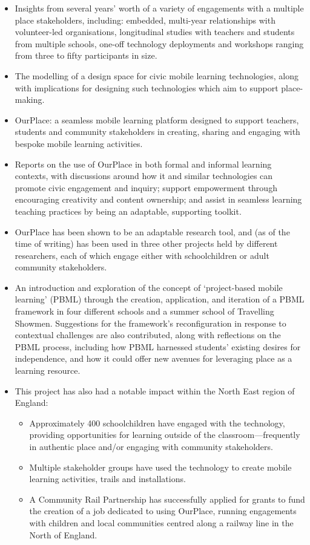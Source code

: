 \begin{itemize}
    \item Insights from several years' worth of a variety of engagements with a multiple place stakeholders, including: embedded, multi-year relationships with volunteer-led organisations, longitudinal studies with teachers and students from multiple schools, one-off technology deployments and workshops ranging from three to fifty participants in size.
    \item The modelling of a design space for civic mobile learning technologies, along with implications for designing such technologies which aim to support place-making.
    \item OurPlace: a seamless mobile learning platform designed to support teachers, students and community stakeholders in creating, sharing and engaging with bespoke mobile learning activities.
    \item Reports on the use of OurPlace in both formal and informal learning contexts, with discussions around how it and similar technologies can promote civic engagement and inquiry; support empowerment through encouraging creativity and content ownership; and assist in seamless learning teaching practices by being an adaptable, supporting toolkit.
    \item OurPlace has been shown to be an adaptable research tool, and (as of the time of writing) has been used in three other projects held by different researchers, each of which engage either with schoolchildren or adult community stakeholders.
    \item An introduction and exploration of the concept of `project-based mobile learning' (PBML) through the creation, application, and iteration of a PBML framework in four different schools and a summer school of Travelling Showmen. Suggestions for the framework's reconfiguration in response to contextual challenges are also contributed, along with reflections on the PBML process, including how PBML harnessed students’ existing desires for independence, and how it could offer new avenues for leveraging place as a learning resource.
    \item This project has also had a notable impact within the North East region of England:
    \begin{itemize}
    \item Approximately 400 schoolchildren have engaged with the technology, providing opportunities for learning outside of the classroom---frequently in authentic place and/or engaging with community stakeholders.
    \item Multiple stakeholder groups have used the technology to create mobile learning activities, trails and installations.
    \item A Community Rail Partnership has successfully applied for grants to fund the creation of a job dedicated to using OurPlace, running engagements with children and local communities centred along a railway line in the North of England.
    \end{itemize}
\end{itemize}

